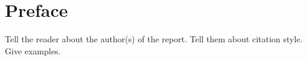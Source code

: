 \section*{Preface}
Tell the reader about the author(s) of the report. Tell them about citation style. Give examples.
